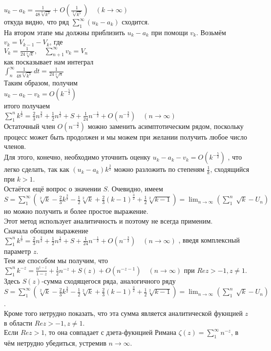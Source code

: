 \documentclass{report}
\begin{document}
$u_k-a_k=\frac{1}{48\sqrt[2]{k^3}}+O\left(\frac{1}{\sqrt[2]{k^5}}\right)\quad(k\to\infty)$ \\
откуда видно, что ряд $\sum_{1}^{\infty}(u_k-a_k)$ сходится. \\
На втором этапе мы должны приблизить $u_k-a_k$ при помощи $v_k$. Возьмём $v_k=V_{k-1}-V_k$, где \\
$V_k=\frac{1}{24\sqrt[2]{k}},\quad\sum_{n+1}^{\infty}v_k=V_n$ \\
как посказывает нам интеграл \\
$\int_{n}^{\infty}\frac{1}{48\sqrt[2]{k^3}}\,dt=\frac{1}{24\sqrt[2]{n}}$ \\
Таким образом, получим \\
$u_k-a_k-v_k=O\left(k^{-\frac{5}{2}}\right)$ \\
итого получаем \\
$\sum_{1}^{n}k^\frac{1}{2}=\frac{2}{3}n^\frac{3}{2}+\frac{1}{2}n^\frac{1}{2}+S+\frac{1}{24}n^{-\frac{1}{2}}+O\left(n^{-\frac{3}{2}}\right)\quad(n\to\infty)$ \\
Остаточный член $O\left(n^{-\frac{3}{2}}\right)$ можно заменить асимптотическим рядом, поскольку процесс может быть продолжен и мы можем при желании получить любое число членов. \\
Для этого, конечно, необходимо уточнить оценку $u_k-a_k-v_k=O\left(k^{-\frac{5}{2}}\right)$ , что легко сделать, так как $(u_k-a_k)k^\frac{3}{2}$ можно разложить по степеням $\frac{1}{k}$, сходящийся при $k>1$. \\
Остаётся ещё вопрос о значении $S$. Очевидно, имеем \\
$S=\sum_{1}^{\infty}\left(\sqrt[2]{k}-\frac{2}{3}k^\frac{3}{2}-\frac{1}{2}\sqrt[2]{k}+\frac{2}{3}(k-1)^\frac{3}{2}+\frac{1}{2}\sqrt[2]{k-1}\right)=\lim_{n\to\infty}\left(\sum_{1}^{n}\sqrt[]{k}-U_n\right)$ \\
но можно получить и более простое выражение. \\
Этот метод использует аналитичность и поэтому не всегда применим. \\
Сначала обощим выражение $\sum_{1}^{n}k^\frac{1}{2}=\frac{2}{3}n^\frac{3}{2}+\frac{1}{2}n^\frac{1}{2}+S+\frac{1}{24}n^{-\frac{1}{2}}+O\left(n^{-\frac{3}{2}}\right)\quad(n\to\infty)$
, введя комплексный параметр $z$. \\
Тем же способом мы получим, что \\
$\sum_{1}^{n}k^{-z}=\frac{n^{1-z}}{1-z}+\frac{1}{2}n^{-z}+S(z)+O\left(n^{-z-1}\right)\quad(n\to\infty)$ при $Re{z}>-1,z\ne{1}$. \\
Здесь $S(z)$-сумма сходящегося ряда, аналогичного ряду \\
$S=\sum_{1}^{\infty}\left(\sqrt[2]{k}-\frac{2}{3}k^\frac{3}{2}-\frac{1}{2}\sqrt[2]{k}+\frac{2}{3}(k-1)^\frac{3}{2}+\frac{1}{2}\sqrt[2]{k-1}\right)=\lim_{n\to\infty}\left(\sum_{1}^{n}\sqrt[]{k}-U_n\right)$. \\
Кроме того нетрудно показать, что эта сумма является аналитической фукнцией $z$ в области $Re{z}>-1,z\ne{1}$. \\
Если $Re{z}>1$, то она совпадает с дзета-фукнцией Римана $\zeta(z)=\sum_{1}^{\infty}n^{-z}$,  в чём нетрудно убедиться, устремив $n\to\infty$.\\
\newpage
\end{document}
